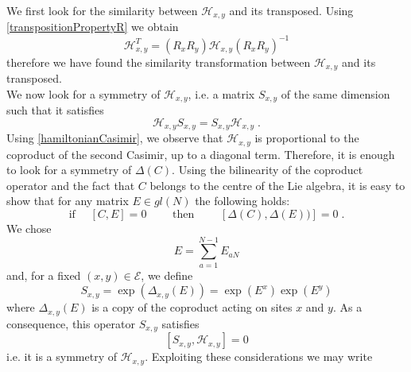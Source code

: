 \documentclass[10pt]{article}
\numberwithin{equation}{section}
\numberwithin{equation}{subsection}
\newcommand{\dt}{\;.}
\begin{document}
We first look for the similarity between $\mathcal{H}_{x,y}$ and its transposed. Using \eqref{transpositionPropertyR} we obtain  
\begin{equation}\label{transpositionPropertyH}
    \mathcal{H}_{x,y}^{T}=\left(R_{x}R_{y}\right)\mathcal{H}_{x,y}\left(R_{x}R_{y}\right)^{-1}
\end{equation}
therefore we have found the similarity transformation between $\mathcal{H}_{x,y}$ and its transposed. \\
We now look for a symmetry of $\mathcal{H}_{x,y}$, i.e. a matrix $S_{x,y}$ of the same dimension such that it satisfies 
\begin{equation}
	\mathcal{H}_{x,y}S_{x,y}=S_{x,y}\mathcal{H}_{x,y}
	\dt
\end{equation}
Using \eqref{hamiltonianCasimir}, we observe that $\mathcal{H}_{x,y}$ is proportional to the coproduct of the second Casimir, up to a diagonal term. Therefore, it is enough to look for a symmetry of $\Delta (C)$. Using the bilinearity of the coproduct operator and the fact that $C$ belongs to the centre of the Lie algebra, it is easy to show that for any matrix $E\in gl(N)$ the following holds:
\begin{equation}
 \text{if } \quad	[C,E]=0\qquad  \text{ then }\qquad \left[\Delta (C),\Delta(E)) \right]=0\dt
\end{equation}
We chose 
\begin{equation}
	E=\sum_{a=1}^{N-1}E_{aN}
\end{equation}
and, for a fixed $(x,y)\in \mathcal{E}$, we define
\begin{equation}
	S_{x,y}=\exp{(\Delta_{x,y}(E))}=\exp{(E^{x})}\exp{(E^{y})}
\end{equation}
where $\Delta_{x,y}(E)$ is a copy of the coproduct acting on sites $x$ and $y$. As a consequence, this operator $S_{x,y}$ satisfies
\begin{equation}\label{symmetryH}
	\left[S_{x,y},\mathcal{H}_{x,y}\right]=0
\end{equation}
i.e. it is a symmetry of $\mathcal{H}_{x,y}$. Exploiting these considerations we may write
\end{document}
